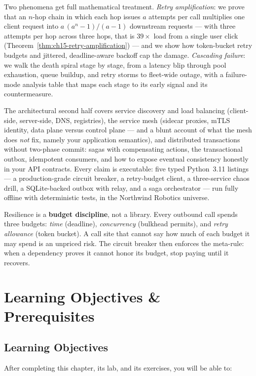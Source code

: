 Two phenomena get full mathematical treatment. \emph{Retry amplification}:
we prove that an $n$-hop chain in which each hop issues $a$ attempts per
call multiplies one client request into $a\,(a^{n}-1)/(a-1)$ downstream
requests --- with three attempts per hop across three hops, that is $39\times$
load from a single user click (Theorem~\ref{thm:ch15-retry-amplification})
--- and we show how token-bucket retry budgets and jittered, deadline-aware
backoff cap the damage. \emph{Cascading failure}: we walk the death spiral
stage by stage, from a latency blip through pool exhaustion, queue buildup,
and retry storms to fleet-wide outage, with a failure-mode analysis table
that maps each stage to its early signal and its countermeasure.

The architectural second half covers service discovery and load balancing
(client-side, server-side, DNS, registries), the service mesh (sidecar
proxies, mTLS identity, data plane versus control plane --- and a blunt
account of what the mesh does \emph{not} fix, namely your application
semantics), and distributed transactions without two-phase commit: sagas
with compensating actions, the transactional outbox, idempotent consumers,
and how to expose eventual consistency honestly in your API contracts. Every
claim is executable: five typed Python~3.11 listings --- a production-grade
circuit breaker, a retry-budget client, a three-service chaos drill, a
SQLite-backed outbox with relay, and a saga orchestrator --- run fully
offline with deterministic tests, in the Northwind Robotics universe.

\begin{keyconceptbox}
Resilience is a \textbf{budget discipline}, not a library. Every outbound
call spends three budgets: \emph{time} (deadline), \emph{concurrency}
(bulkhead permits), and \emph{retry allowance} (token bucket). A call site
that cannot say how much of each budget it may spend is an unpriced risk.
The circuit breaker then enforces the meta-rule: when a dependency proves
it cannot honor its budget, stop paying until it recovers.
\end{keyconceptbox}

\section{Learning Objectives \& Prerequisites}
\label{sec:ch15-objectives}

\subsection*{Learning Objectives}
After completing this chapter, its lab, and its exercises, you will be able
to:

